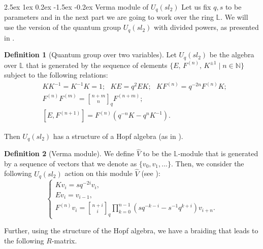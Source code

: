 \documentclass[reqno,a4paper,11pt]{amsart}
\makeatletter
\numberwithin{equation}{section}
\numberwithin{figure}{section}
\theoremstyle{definition}
\newtheorem{defn}{Definition}[section]
\theoremstyle{plain}
\renewcommand*{\subsection}{\@startsection{subsection}{2}{\z@}%
	{2.5ex \@plus 1ex \@minus 0.2ex}%
	{-1.5ex \@plus -0.2ex}%
	{\normalfont\normalsize\bfseries}}
\newcommand{\Li}{{\mathbb L}}
\makeatother
\begin{document}
\subsection{Verma module of $U_q(sl_2)$}\label{2}
%
Let us fix $q, s$ to be parameters and in the next part we are going to work over the ring 
$\Li$.
We will use the version of the quantum group $U_q(sl_2)$ with divided powers, as presented in \cite{JK}.
%
\begin{defn}[Quantum group over two variables]
Let  $U_q(sl_2)$ be the algebra over $\Li$ that is generated by the sequence of elements $\{ E,\, F^{(n)}, \,K^{\pm1} \mid n \in \mathbb N\}$ subject to the following relations:
\begin{equation*}
\begin{aligned}
&KK^{-1}=K^{-1}K=1; \ \ \ KE=q^2EK; \ \ \ KF^{(n)}=q^{-2n} F^{(n)}K;\\
&F^{(n)}F^{(m)}= {n+m \brack n}_{q} F^{(n+m)};\\
&[E,F^{(n+1)}]=F^{(n)}(q^{-n}K-q^{n}K^{-1}).
\end{aligned}
\end{equation*}
\end{defn}
%
Then  $U_q(sl_2)$ has a structure of a Hopf algebra (as in \cite{JK}).
%
\begin{defn}[Verma module]
%
We define $\hat{V}$ to be the $\Li$-module that is generated by a sequence of vectors that we denote as $\{v_0, v_1,...\}$. Then, we consider the following $U_q(sl_2)$ action on this module $\hat{V}$ (see \cite{JK}):
%
\begin{equation*}%
\begin{cases}
Kv_i=sq^{-2i}v_i,\\
Ev_i=v_{i-1},\\
\displaystyle F^{(n)}v_i = {n+i \brack i}_q \prod _{k=0}^{n-1} (sq^{-k-i}-s^{-1} q^{k+i}) v_{i+n}.
\end{cases}
\end{equation*}
%
\end{defn}
%
Further, using the structure of the Hopf algebra, we have a braiding that leads to the following $R$-matrix.
\end{document}
